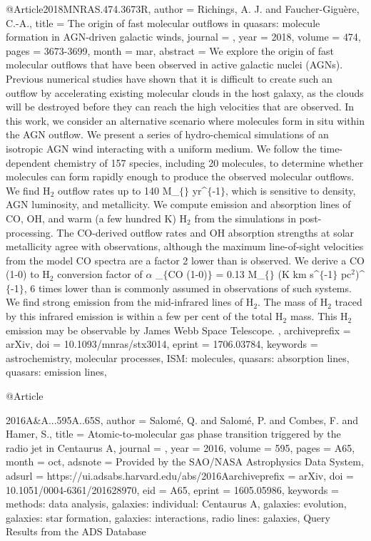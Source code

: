 \documentclass[longauth]{aa}
\begin{document}
{{{{{{{{{@Article{2018MNRAS.474.3673R,
  author        = {Richings, A. J. and Faucher-Gigu{\`e}re, C.-A.},
  title         = {The origin of fast molecular outflows in quasars: molecule formation in AGN-driven galactic winds},
  journal       = {\mnras},
  year          = {2018},
  volume        = {474},
  pages         = {3673-3699},
  month         = mar,
  abstract      = {We explore the origin of fast molecular outflows that have been observed
in active galactic nuclei (AGNs). Previous numerical studies have shown
that it is difficult to create such an outflow by accelerating existing
molecular clouds in the host galaxy, as the clouds will be destroyed
before they can reach the high velocities that are observed. In this
work, we consider an alternative scenario where molecules form in situ
within the AGN outflow. We present a series of hydro-chemical
simulations of an isotropic AGN wind interacting with a uniform medium.
We follow the time-dependent chemistry of 157 species, including 20
molecules, to determine whether molecules can form rapidly enough to
produce the observed molecular outflows. We find H$_{2}$ outflow
rates up to 140 M\_$\{${\sun}$\}$ yr\^{}$\{$-1$\}$, which is sensitive to density, AGN
luminosity, and metallicity. We compute emission and absorption lines of
CO, OH, and warm (a few hundred K) H$_{2}$ from the simulations in
post-processing. The CO-derived outflow rates and OH absorption
strengths at solar metallicity agree with observations, although the
maximum line-of-sight velocities from the model CO spectra are a factor
{\ap}2 lower than is observed. We derive a CO (1-0) to H$_{2}$
conversion factor of {$\alpha$} \_$\{$CO (1-0)$\}$ = 0.13 M\_$\{${\sun}$\}$ (K km s\^{}$\{$-1$\}$
pc$^{2}$)\^{}$\{$-1$\}$, 6 times lower than is commonly assumed in
observations of such systems. We find strong emission from the
mid-infrared lines of H$_{2}$. The mass of H$_{2}$ traced by
this infrared emission is within a few per cent of the total
H$_{2}$ mass. This H$_{2}$ emission may be observable by
James Webb Space Telescope.
},
  archiveprefix = {arXiv},
  doi           = {10.1093/mnras/stx3014},
  eprint        = {1706.03784},
  keywords      = {astrochemistry, molecular processes, ISM: molecules, quasars: absorption lines, quasars: emission lines},
}

@Article{2016A&A...595A..65S,
  author        = {{Salom{\'e}}, Q. and {Salom{\'e}}, P. and {Combes}, F. and {Hamer}, S.},
  title         = {Atomic-to-molecular gas phase transition triggered by the radio jet in Centaurus A},
  journal       = {\aap},
  year          = {2016},
  volume        = {595},
  pages         = {A65},
  month         = oct,
  adsnote       = {Provided by the SAO/NASA Astrophysics Data System},
  adsurl        = {https://ui.adsabs.harvard.edu/abs/2016Aarchiveprefix = {arXiv},
  doi           = {10.1051/0004-6361/201628970},
  eid           = {A65},
  eprint        = {1605.05986},
  keywords      = {methods: data analysis, galaxies: individual: Centaurus A, galaxies: evolution, galaxies: star formation, galaxies: interactions, radio lines: galaxies},
}
Query Results from the ADS Database


}}}}}}}}}}
\end{document}
